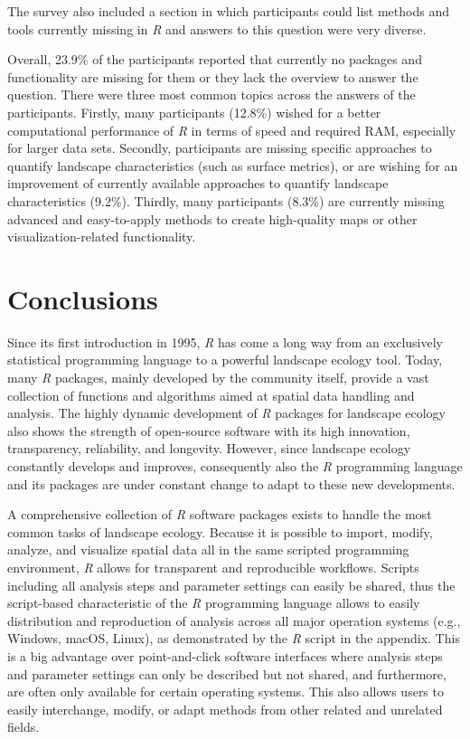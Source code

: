 \documentclass[smallextended]{svjour3}       %
\begin{document}
The survey also included a section in which participants could list methods and tools currently missing in \textit{R} and answers to this question were very diverse.

Overall, 23.9\% of the participants reported that currently no packages and functionality are missing for them or they lack the overview to answer the question.
There were three most common topics across the answers of the participants.
Firstly, many participants (12.8\%) wished for a better computational performance of \textit{R} in terms of speed and required RAM, especially for larger data sets.
Secondly, participants are missing specific approaches to quantify landscape characteristics (such as surface metrics), or are wishing for an improvement of currently available approaches to quantify landscape characteristics (9.2\%).
Thirdly, many participants (8.3\%) are currently missing advanced and easy-to-apply methods to create high-quality maps or other visualization-related functionality.

\hypertarget{conclusions}{%
\section{Conclusions}\label{conclusions}}

Since its first introduction in 1995, \textit{R} has come a long way from an exclusively statistical programming language to a powerful landscape ecology tool.
Today, many \textit{R} packages, mainly developed by the community itself, provide a vast collection of functions and algorithms aimed at spatial data handling and analysis.
The highly dynamic development of \textit{R} packages for landscape ecology also shows the strength of open-source software with its high innovation, transparency, reliability, and longevity.
However, since landscape ecology constantly develops and improves, consequently also the \textit{R} programming language and its packages are under constant change to adapt to these new developments.

A comprehensive collection of \textit{R} software packages exists to handle the most common tasks of landscape ecology.
Because it is possible to import, modify, analyze, and visualize spatial data all in the same scripted programming environment, \textit{R} allows for transparent and reproducible workflows.
Scripts including all analysis steps and parameter settings can easily be shared, thus the script-based characteristic of the \textit{R} programming language allows to easily distribution and reproduction of analysis across all major operation systems (e.g., Windows, macOS, Linux), as demonstrated by the \textit{R} script in the appendix.
This is a big advantage over point-and-click software interfaces where analysis steps and parameter settings can only be described but not shared, and furthermore, are often only available for certain operating systems.
This also allows users to easily interchange, modify, or adapt methods from other related and unrelated fields.
\end{document}
